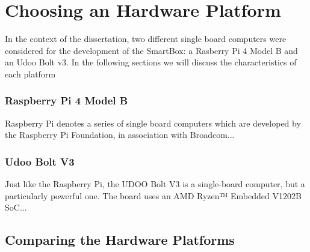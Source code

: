 


\section{Choosing an Hardware Platform}

In the context of the dissertation, two different single board computers were considered for the development of the SmartBox: a Rasberry Pi 4 Model B and an Udoo Bolt v3. In the following sections we will discuss the characteristics of each platform 


\subsubsection{Raspberry Pi 4 Model B}

Raspberry Pi denotes a series of single board computers which are developed by the Raspberry Pi Foundation, in association with Broadcom...

\subsubsection{Udoo Bolt V3}

Just like the Raspberry Pi, the UDOO Bolt V3 is a single-board computer, but a particularly powerful one. The board uses an AMD Ryzen™ Embedded V1202B SoC...

\subsection{Comparing the Hardware Platforms}

